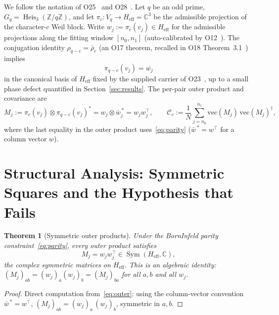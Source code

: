\documentclass[12pt,a4paper]{article}
\newtheorem{theorem}{Theorem}[section]
\theoremstyle{remark}
\DeclareMathOperator{\Sym}{Sym}
\DeclareMathOperator{\Heis}{Heis}
\newcommand{\Heff}{H_{\mathrm{eff}}}
\newcommand{\Cc}{\mathcal{C}_c}
\begin{document}
    We follow the notation of O25~\cite{Beau2026a29} and O28~\cite{Beau2026a32}.
    Let $q$ be an odd prime, $G_q = \Heis_3(\mathbb{Z}/q\mathbb{Z})$, and let $\pi_c : V_q \to \Heff = \mathbb{C}^3$
    be the admissible projection of the character-$c$ Weil block.
    Write $w_j := \pi_c(v_j) \in \Heff$ for the admissible projections along the fitting window $[n_0, n_1]$
    (auto-calibrated by O12~\cite{Beau2026a16}).
    The conjugation identity $\rho_{q-c} = \bar{\rho}_c$ (an O17 theorem, recalled in O18
    Theorem~3.1~\cite{Beau2026a22}) implies
    \begin{equation}
      \pi_{q-c}(v_j) = \overline{w_j}
      \label{eq:parity}
    \end{equation}
    in the canonical basis of $\Heff$ fixed by the supplied carrier of O23~\cite{Beau2026a27},
    up to a small phase defect quantified in
    Section~\ref{sec:results}.
    The per-pair outer product and covariance are
    \begin{equation}
      M_j := \pi_c(v_j) \otimes \pi_{q-c}(v_j)^{*}
      = w_j \otimes \bar{w}_j^{\,*}
      = w_j w_j^{\top},
      \qquad
      \Cc := \frac{1}{N} \sum_{j=n_0}^{n_1} \mathrm{vec}(M_j)\, \mathrm{vec}(M_j)^{\dagger},
      \label{eq:outer}
    \end{equation}
    where the last equality in the outer product uses~\eqref{eq:parity} ($\bar{w}^{\,*} = w^{\top}$ for a column
    vector $w$).

  \section{Structural Analysis: Symmetric Squares and the Hypothesis that Fails}
    \label{sec:structural}

    \begin{theorem}[Symmetric outer products]
      \label{thm:sym}
      Under the Born\textendash{}Infeld parity constraint~\eqref{eq:parity}, every outer product satisfies
      \begin{equation}
        M_j = w_j w_j^{\top} \in \Sym(\Heff, \mathbb{C}),
        \label{eq:sym}
      \end{equation}
      the complex symmetric matrices on $\Heff$.
      This is an algebraic identity: $(M_j)_{ab} = (w_j)_a(w_j)_b = (M_j)_{ba}$ for all $a, b$ and all $w_j$.
    \end{theorem}

    \begin{proof}
      Direct computation from~\eqref{eq:outer}: using the column-vector convention $\bar{w}^{\,*} = w^{\top}$,
      $(M_j)_{ab} = (w_j)_a\,(w_j)_b$, symmetric in $a, b$.
    \end{proof}
\end{document}
